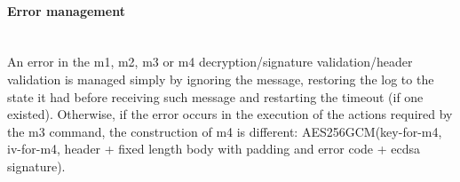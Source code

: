 \paragraph{Error management}\hspace{0pt}\\
An error in the m1, m2, m3 or m4 decryption/signature validation/header validation is managed simply by ignoring the message, restoring the log to the state it had before receiving such message and restarting the timeout (if one existed). Otherwise, if the error occurs in the execution of the actions required by the m3 command, the construction of m4 is different: AES256GCM(key-for-m4, iv-for-m4, header + fixed length body with padding and error code + ecdsa signature).